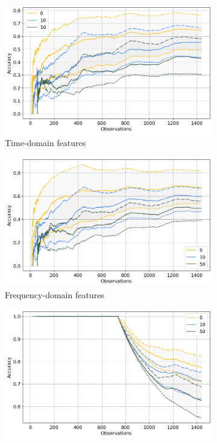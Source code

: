 \begin{figure}[h]
    \centering
    \begin{subfigure}[b]{0.48\textwidth}
        \includegraphics[width=\textwidth]{assets/results/incremental-learning/skip-label-TD.png}
        \caption{Time-domain features}
    \end{subfigure}
    \hfill
    \begin{subfigure}[b]{0.48\textwidth}
        \includegraphics[width=\textwidth]{assets/results/incremental-learning/skip-label-FD.png}
        \caption{Frequency-domain features}
    \end{subfigure}
    \hfill
    \begin{subfigure}[b]{0.48\textwidth}
        \includegraphics[width=\textwidth]{assets/results/incremental-learning/skip-label-TD-severity.png}

\end{subfigure}
\end{figure}
